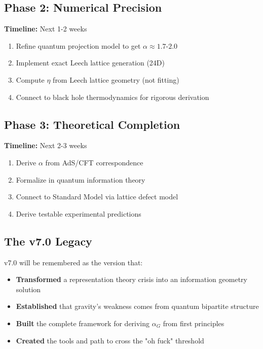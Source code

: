 \documentclass[11pt,titlepage]{article}
\begin{document}
\subsection{Phase 2: Numerical Precision}

\textbf{Timeline:} Next 1-2 weeks
\begin{enumerate}
\item Refine quantum projection model to get $\alpha \approx 1.7$-$2.0$
\item Implement exact Leech lattice generation (24D)
\item Compute $\eta$ from Leech lattice geometry (not fitting)
\item Connect to black hole thermodynamics for rigorous derivation
\end{enumerate}

\subsection{Phase 3: Theoretical Completion}

\textbf{Timeline:} Next 2-3 weeks
\begin{enumerate}
\item Derive $\alpha$ from AdS/CFT correspondence
\item Formalize in quantum information theory
\item Connect to Standard Model via lattice defect model
\item Derive testable experimental predictions
\end{enumerate}

\subsection{The v7.0 Legacy}

v7.0 will be remembered as the version that:
\begin{itemize}
\item \textbf{Transformed} a representation theory crisis into an information geometry solution
\item \textbf{Established} that gravity's weakness comes from quantum bipartite structure
\item \textbf{Built} the complete framework for deriving $\alpha_G$ from first principles
\item \textbf{Created} the tools and path to cross the "oh fuck" threshold
\end{itemize}

\begin{center}
\end{center}
\end{document}
